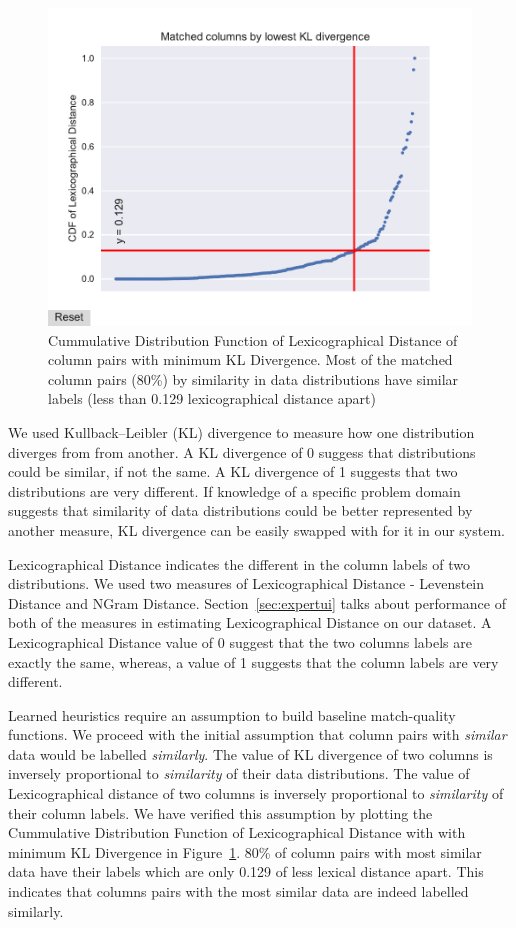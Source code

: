 \begin{figure}
	\centering
	\includegraphics[width=1\columnwidth]{graphics/CDF_LexDistance}
	\caption{Cummulative Distribution Function of Lexicographical Distance of column pairs with minimum KL Divergence. Most of the matched column pairs (80\%) by similarity in data distributions have similar labels (less than 0.129 lexicographical distance apart)}
	\label{fig:cdflexdist}
	\trimfigurespacing
\end{figure}

We used Kullback–Leibler (KL) divergence to measure how one distribution diverges from from another. A KL divergence of 0 suggess that distributions could be similar, if not the same. A KL divergence of 1 suggests that two distributions are very different. If knowledge of a specific problem domain suggests that similarity of data distributions could be better represented by another measure, KL divergence can be easily swapped with for it in our system.  

Lexicographical Distance indicates the different in the column labels of two distributions. We used two measures of Lexicographical Distance - Levenstein Distance and NGram Distance. Section~\ref{sec:expertui} talks about performance of both of the measures in estimating Lexicographical Distance on our dataset. A Lexicographical Distance value of 0 suggest that the two columns labels are exactly the same, whereas, a value of 1 suggests that the column labels are very different.

Learned heuristics require an assumption to build baseline match-quality functions. We proceed with the initial assumption that column pairs with \textit{similar} data would be labelled \textit{similarly}. The value of KL divergence of two columns is inversely proportional to \textit{similarity} of their data distributions. The value of Lexicographical distance of two columns is inversely proportional to \textit{similarity} of their column labels. We have verified this assumption by plotting the Cummulative Distribution Function of Lexicographical Distance with with minimum KL Divergence in Figure~\ref{fig:cdflexdist}. 80\% of column pairs with most similar data have their labels which are only 0.129 of less lexical distance apart. This indicates that columns pairs with the most similar data are indeed labelled similarly. 
 
